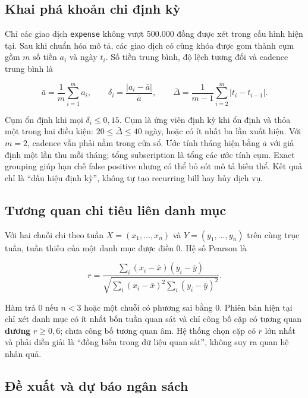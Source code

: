 \subsection{Khai phá khoản chi định kỳ}

Chỉ các giao dịch \texttt{expense} không vượt 500.000 đồng được xét
trong cấu hình hiện tại. Sau khi chuẩn hóa mô tả, các giao dịch có cùng
khóa được gom thành cụm gồm $m$ số tiền $a_i$ và ngày $t_i$. Số tiền
trung bình, độ lệch tương đối và cadence trung bình là

\begin{equation}
  \bar a=\frac{1}{m}\sum_{i=1}^{m}a_i,\qquad
  \delta_i=\frac{|a_i-\bar a|}{\bar a},\qquad
  \bar\Delta=\frac{1}{m-1}\sum_{i=2}^{m}|t_i-t_{i-1}|.
\end{equation}

Cụm ổn định khi mọi $\delta_i\leq0{,}15$. Cụm là ứng viên định kỳ khi
ổn định và thỏa một trong hai điều kiện: $20\leq\bar\Delta\leq40$ ngày,
hoặc có ít nhất ba lần xuất hiện. Với $m=2$, cadence vẫn phải nằm trong
cửa sổ. Ước tính tháng hiện bằng $\bar a$ với giả định một lần thu mỗi
tháng; tổng subscription là tổng các ước tính cụm. Exact grouping giúp
hạn chế false positive nhưng có thể bỏ sót mô tả biến thể. Kết quả chỉ
là ``dấu hiệu định kỳ'', không tự tạo recurring bill hay hủy dịch vụ.

\subsection{Tương quan chi tiêu liên danh mục}

Với hai chuỗi chi theo tuần $X=(x_1,\ldots,x_n)$ và
$Y=(y_1,\ldots,y_n)$ trên cùng trục tuần, tuần thiếu của một danh mục
được điền 0. Hệ số Pearson là

\begin{equation}
  r=\frac{\sum_i(x_i-\bar{x})(y_i-\bar{y})}
  {\sqrt{\sum_i(x_i-\bar{x})^2\sum_i(y_i-\bar{y})^2}}.
\end{equation}

Hàm trả 0 nếu $n<3$ hoặc một chuỗi có phương sai bằng 0. Phiên bản hiện
tại chỉ xét danh mục có ít nhất bốn tuần quan sát và chỉ công bố cặp có
tương quan \textbf{dương} $r\geq0{,}6$; chưa công bố tương quan âm. Hệ
thống chọn cặp có $r$ lớn nhất và phải diễn giải là ``đồng biến trong dữ
liệu quan sát'', không suy ra quan hệ nhân quả.

\subsection{Đề xuất và dự báo ngân sách}

